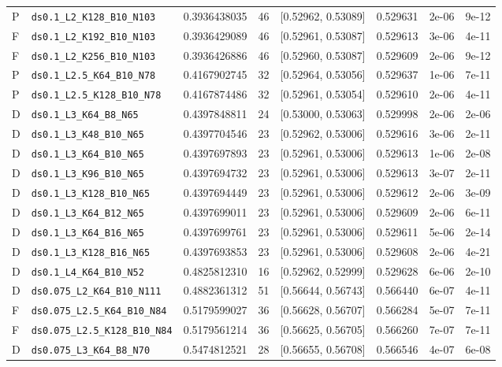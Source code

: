 \begin{longtable}{@{}llrllllr@{}}
P & \texttt{ds0.1\_L2\_K128\_B10\_N103} & 0.3936438035 & 46 & [0.52962, 0.53089] & 0.529631 & 2e-06 & 9e-12\\
F & \texttt{ds0.1\_L2\_K192\_B10\_N103} & 0.3936429089 & 46 & [0.52961, 0.53087] & 0.529613 & 3e-06 & 4e-11\\
F & \texttt{ds0.1\_L2\_K256\_B10\_N103} & 0.3936426886 & 46 & [0.52960, 0.53087] & 0.529609 & 2e-06 & 9e-12\\
P & \texttt{ds0.1\_L2.5\_K64\_B10\_N78} & 0.4167902745 & 32 & [0.52964, 0.53056] & 0.529637 & 1e-06 & 7e-11\\
P & \texttt{ds0.1\_L2.5\_K128\_B10\_N78} & 0.4167874486 & 32 & [0.52961, 0.53054] & 0.529610 & 2e-06 & 4e-11\\
D & \texttt{ds0.1\_L3\_K64\_B8\_N65} & 0.4397848811 & 24 & [0.53000, 0.53063] & 0.529998 & 2e-06 & 2e-06\\
D & \texttt{ds0.1\_L3\_K48\_B10\_N65} & 0.4397704546 & 23 & [0.52962, 0.53006] & 0.529616 & 3e-06 & 2e-11\\
D & \texttt{ds0.1\_L3\_K64\_B10\_N65} & 0.4397697893 & 23 & [0.52961, 0.53006] & 0.529613 & 1e-06 & 2e-08\\
D & \texttt{ds0.1\_L3\_K96\_B10\_N65} & 0.4397694732 & 23 & [0.52961, 0.53006] & 0.529613 & 3e-07 & 2e-11\\
D & \texttt{ds0.1\_L3\_K128\_B10\_N65} & 0.4397694449 & 23 & [0.52961, 0.53006] & 0.529612 & 2e-06 & 3e-09\\
D & \texttt{ds0.1\_L3\_K64\_B12\_N65} & 0.4397699011 & 23 & [0.52961, 0.53006] & 0.529609 & 2e-06 & 6e-11\\
D & \texttt{ds0.1\_L3\_K64\_B16\_N65} & 0.4397699761 & 23 & [0.52961, 0.53006] & 0.529611 & 5e-06 & 2e-14\\
D & \texttt{ds0.1\_L3\_K128\_B16\_N65} & 0.4397693853 & 23 & [0.52961, 0.53006] & 0.529608 & 2e-06 & 4e-21\\
D & \texttt{ds0.1\_L4\_K64\_B10\_N52} & 0.4825812310 & 16 & [0.52962, 0.52999] & 0.529628 & 6e-06 & 2e-10\\
D & \texttt{ds0.075\_L2\_K64\_B10\_N111} & 0.4882361312 & 51 & [0.56644, 0.56743] & 0.566440 & 6e-07 & 4e-11\\
F & \texttt{ds0.075\_L2.5\_K64\_B10\_N84} & 0.5179599027 & 36 & [0.56628, 0.56707] & 0.566284 & 5e-07 & 7e-11\\
F & \texttt{ds0.075\_L2.5\_K128\_B10\_N84} & 0.5179561214 & 36 & [0.56625, 0.56705] & 0.566260 & 7e-07 & 7e-11\\
D & \texttt{ds0.075\_L3\_K64\_B8\_N70} & 0.5474812521 & 28 & [0.56655, 0.56708] & 0.566546 & 4e-07 & 6e-08\\

\end{longtable}
